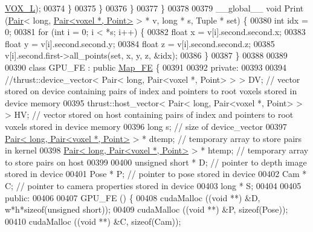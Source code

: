 \begin{DoxyCode}
{      \hyperlink{Voxel_8hpp_a3c1c8b966e30fa8ca2de07abe3b3d74a}{VOX\_L});
00374             \}
00375         \}
00376     \}
00377 \}
00378 
00379 \_\_global\_\_ \textcolor{keywordtype}{void} Print (\hyperlink{classPair}{Pair}< \textcolor{keywordtype}{long}, \hyperlink{classPair}{Pair<voxel *, Point>} > * v, \textcolor{keywordtype}{long} * s, Tuple * \textcolor{keyword}{
      set}) \{
00380     \textcolor{keywordtype}{int} idx = 0;
00381     \textcolor{keywordflow}{for} (\textcolor{keywordtype}{int} i = 0; i < *s; i++) \{
00382         \textcolor{keywordtype}{float} x = v[i].second.second.x;
00383         \textcolor{keywordtype}{float} y = v[i].second.second.y;
00384         \textcolor{keywordtype}{float} z = v[i].second.second.z;
00385         v[i].second.first->all\_points(\textcolor{keyword}{set}, x, y, z, &idx);
00386     \}
00387 \}
00388 
00389 
00390 \textcolor{keyword}{class }GPU\_FE : \textcolor{keyword}{public} \hyperlink{classMap__FE}{Map\_FE} \{
00391 
00392 \textcolor{keyword}{private}:
00393 
00394     \textcolor{comment}{//thrust::device\_vector< Pair< long, Pair<voxel *, Point> > > DV; // vector stored on device containing
       pairs of index and pointers to root voxels stored in device memory}
00395     thrust::host\_vector< Pair< long, Pair<voxel *, Point> > > HV; \textcolor{comment}{// vector stored on host containing pairs
       of index and pointers to root voxels stored in device memory}
00396     \textcolor{keywordtype}{long} s; \textcolor{comment}{// size of device\_vector}
00397     \hyperlink{classPair}{Pair< long, Pair<voxel *, Point>} > * dtemp; \textcolor{comment}{// temporary array to store
       pairs in kernel}
00398     \hyperlink{classPair}{Pair< long, Pair<voxel *, Point>} > * htemp; \textcolor{comment}{// temporary array to store
       pairs on host}
00399 
00400     \textcolor{keywordtype}{unsigned} \textcolor{keywordtype}{short} * D; \textcolor{comment}{// pointer to depth image stored in device}
00401     Pose * P; \textcolor{comment}{// pointer to pose stored in device}
00402     Cam * C; \textcolor{comment}{// pointer to camera properties stored in device}
00403     \textcolor{keywordtype}{long} * S;
00404 
00405 \textcolor{keyword}{public}:
00406 
00407     GPU\_FE () \{
00408         cudaMalloc ((\textcolor{keywordtype}{void} **) &D, w*h*\textcolor{keyword}{sizeof}(\textcolor{keywordtype}{unsigned} \textcolor{keywordtype}{short}));
00409         cudaMalloc ((\textcolor{keywordtype}{void} **) &P, \textcolor{keyword}{sizeof}(Pose));
00410         cudaMalloc ((\textcolor{keywordtype}{void} **) &C, \textcolor{keyword}{sizeof}(Cam));
}
\end{DoxyCode}
